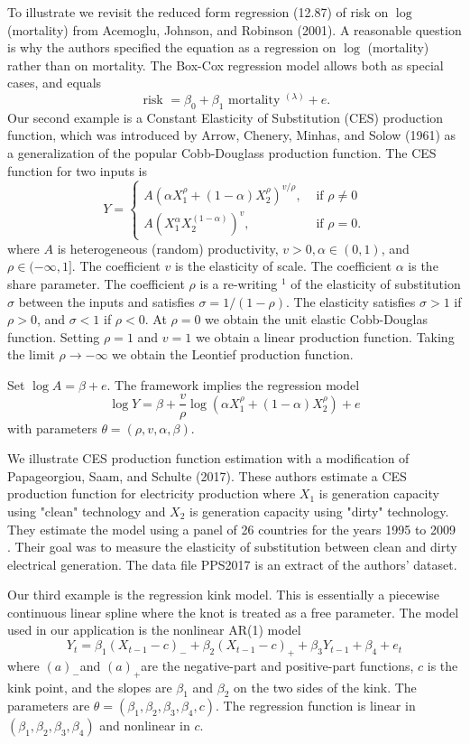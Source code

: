 \documentclass[10pt]{article}
\begin{document}
To illustrate we revisit the reduced form regression (12.87) of risk on $\log$ (mortality) from Acemoglu, Johnson, and Robinson (2001). A reasonable question is why the authors specified the equation as a regression on $\log$ (mortality) rather than on mortality. The Box-Cox regression model allows both as special cases, and equals
$$
\text { risk }=\beta_{0}+\beta_{1} \text { mortality }{ }^{(\lambda)}+e .
$$
Our second example is a Constant Elasticity of Substitution (CES) production function, which was introduced by Arrow, Chenery, Minhas, and Solow (1961) as a generalization of the popular Cobb-Douglass production function. The CES function for two inputs is
$$
Y=\left\{\begin{array}{cc}
A\left(\alpha X_{1}^{\rho}+(1-\alpha) X_{2}^{\rho}\right)^{v / \rho}, & \text { if } \rho \neq 0 \\
A\left(X_{1}^{\alpha} X_{2}^{(1-\alpha)}\right)^{v}, & \text { if } \rho=0 .
\end{array}\right.
$$
where $A$ is heterogeneous (random) productivity, $v>0, \alpha \in(0,1)$, and $\rho \in(-\infty, 1]$. The coefficient $v$ is the elasticity of scale. The coefficient $\alpha$ is the share parameter. The coefficient $\rho$ is a re-writing ${ }^{1}$ of the elasticity of substitution $\sigma$ between the inputs and satisfies $\sigma=1 /(1-\rho)$. The elasticity satisfies $\sigma>1$ if $\rho>0$, and $\sigma<1$ if $\rho<0$. At $\rho=0$ we obtain the unit elastic Cobb-Douglas function. Setting $\rho=1$ and $v=1$ we obtain a linear production function. Taking the limit $\rho \rightarrow-\infty$ we obtain the Leontief production function.

Set $\log A=\beta+e$. The framework implies the regression model
$$
\log Y=\beta+\frac{v}{\rho} \log \left(\alpha X_{1}^{\rho}+(1-\alpha) X_{2}^{\rho}\right)+e
$$
with parameters $\theta=(\rho, v, \alpha, \beta)$.

We illustrate CES production function estimation with a modification of Papageorgiou, Saam, and Schulte (2017). These authors estimate a CES production function for electricity production where $X_{1}$ is generation capacity using "clean" technology and $X_{2}$ is generation capacity using "dirty" technology. They estimate the model using a panel of 26 countries for the years 1995 to 2009 . Their goal was to measure the elasticity of substitution between clean and dirty electrical generation. The data file PPS2017 is an extract of the authors' dataset.

Our third example is the regression kink model. This is essentially a piecewise continuous linear spline where the knot is treated as a free parameter. The model used in our application is the nonlinear AR(1) model
$$
Y_{t}=\beta_{1}\left(X_{t-1}-c\right)_{-}+\beta_{2}\left(X_{t-1}-c\right)_{+}+\beta_{3} Y_{t-1}+\beta_{4}+e_{t}
$$
where $(a)_{-}$and $(a)_{+}$are the negative-part and positive-part functions, $c$ is the kink point, and the slopes are $\beta_{1}$ and $\beta_{2}$ on the two sides of the kink. The parameters are $\theta=\left(\beta_{1}, \beta_{2}, \beta_{3}, \beta_{4}, c\right)$. The regression function is linear in $\left(\beta_{1}, \beta_{2}, \beta_{3}, \beta_{4}\right)$ and nonlinear in $c$.
\end{document}
